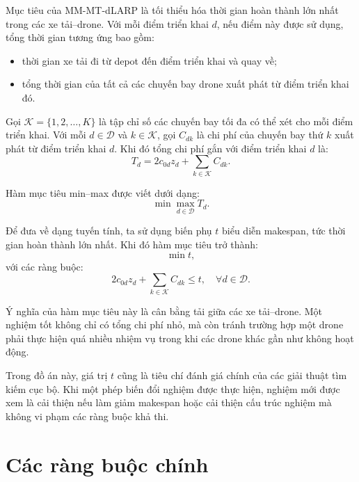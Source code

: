 Mục tiêu của MM-MT-dLARP là tối thiểu hóa thời gian hoàn thành lớn nhất trong các xe tải--drone. Với mỗi điểm triển khai $d$, nếu điểm này được sử dụng, tổng thời gian tương ứng bao gồm:
\begin{itemize}
\item thời gian xe tải đi từ depot đến điểm triển khai và quay về;
\item tổng thời gian của tất cả các chuyến bay drone xuất phát từ điểm triển khai đó.
\end{itemize}

Gọi $\mathcal{K} = \{1,2,\ldots,K\}$ là tập chỉ số các chuyến bay tối đa có thể xét cho mỗi điểm triển khai. Với mỗi $d \in \mathcal{D}$ và $k \in \mathcal{K}$, gọi $C_{dk}$ là chi phí của chuyến bay thứ $k$ xuất phát từ điểm triển khai $d$. Khi đó tổng chi phí gắn với điểm triển khai $d$ là:
\begin{equation}
T_d = 2c_{0d}z_d + \sum_{k \in \mathcal{K}} C_{dk}.
\end{equation}

Hàm mục tiêu min--max được viết dưới dạng:
\begin{equation}
\min \max_{d \in \mathcal{D}} T_d.
\end{equation}

Để đưa về dạng tuyến tính, ta sử dụng biến phụ $t$ biểu diễn makespan, tức thời gian hoàn thành lớn nhất. Khi đó hàm mục tiêu trở thành:
\begin{equation}
\min t,
\end{equation}
với các ràng buộc:
\begin{equation}
2c_{0d}z_d + \sum_{k \in \mathcal{K}} C_{dk} \leq t,
\quad \forall d \in \mathcal{D}.
\end{equation}

Ý nghĩa của hàm mục tiêu này là cân bằng tải giữa các xe tải--drone. Một nghiệm tốt không chỉ có tổng chi phí nhỏ, mà còn tránh trường hợp một drone phải thực hiện quá nhiều nhiệm vụ trong khi các drone khác gần như không hoạt động.

Trong đồ án này, giá trị $t$ cũng là tiêu chí đánh giá chính của các giải thuật tìm kiếm cục bộ. Khi một phép biến đổi nghiệm được thực hiện, nghiệm mới được xem là cải thiện nếu làm giảm makespan hoặc cải thiện cấu trúc nghiệm mà không vi phạm các ràng buộc khả thi.

\section{Các ràng buộc chính}

